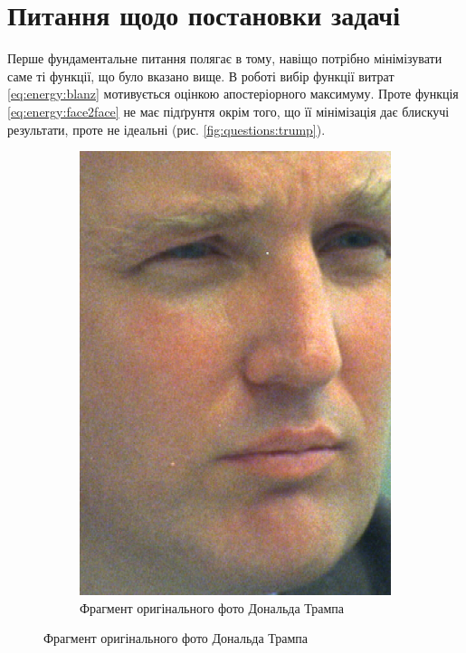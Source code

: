\section{Питання щодо постановки задачі}

Перше фундаментальне питання полягає в тому,
навіщо потрібно мінімізувати саме ті функції, що було вказано вище.
В роботі \cite{blanz:romdhani:vetter} вибір функції витрат
\eqref{eq:energy:blanz} мотивується оцінкою апостеріорного максимуму.
Проте функція \eqref{eq:energy:face2face} не має підґрунтя окрім того,
що її мінімізація дає блискучі результати, проте не ідеальні
(рис. \ref{fig:questions:trump}).
\begin{figure}[h]
  \centering
  \begin{subfigure}[b]{0.4\textwidth}
    \centering
    \includegraphics[width=\textwidth]{images/trump}
    \caption{Фрагмент оригінального фото Дональда Трампа}

\end{subfigure}
\end{figure}

